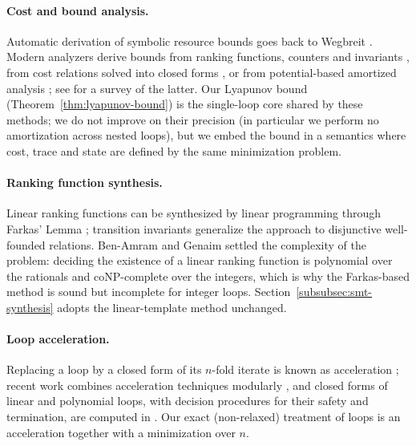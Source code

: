 \documentclass[oneside,english]{amsart}
\numberwithin{equation}{section}
\numberwithin{figure}{section}
\theoremstyle{plain}
\theoremstyle{definition}
\theoremstyle{plain}
\theoremstyle{remark}
\theoremstyle{plain}
\theoremstyle{definition}
\theoremstyle{plain}
\theoremstyle{remark}
\begin{document}
\paragraph{Cost and bound analysis.}
Automatic derivation of symbolic resource bounds goes back to Wegbreit \cite{wegbreit1975mechanical}.
Modern analyzers derive bounds from ranking functions, counters and invariants
\cite{gulwani2009speed,alias2010multi,sinn2014complexity,brockschmidt2016analyzing,lommen2022automatic}, from cost
relations solved into closed forms \cite{albert2011closed}, or from potential-based
amortized analysis \cite{hoffmann2012multivariate,carbonneaux2015compositional}; see \cite{hoffmann2022two} for a survey of
the latter. Our Lyapunov bound (Theorem~\ref{thm:lyapunov-bound})
is the single-loop core shared by these methods; we do not improve on their precision (in particular we perform no
amortization across nested loops), but we embed the bound in a semantics where cost, trace and state are
defined by the same minimization problem.

\paragraph{Ranking function synthesis.}
Linear ranking functions can be synthesized by linear programming through Farkas' Lemma
\cite{colon2001synthesis,podelski2004complete}; transition invariants \cite{podelski2004transition} generalize the
approach to disjunctive well-founded relations. Ben-Amram and Genaim \cite{benamram2014ranking} settled the complexity of
the problem: deciding the existence of a linear ranking function is polynomial over the rationals and coNP-complete over
the integers, which is why the Farkas-based method is sound but incomplete for integer loops.
Section~\ref{subsubsec:smt-synthesis} adopts the linear-template method unchanged.

\paragraph{Loop acceleration.}
Replacing a loop by a closed form of its $n$-fold iterate is known as acceleration \cite{bardin2008fast}; recent work
combines acceleration techniques modularly \cite{frohn2020calculus}, and closed forms of linear and polynomial loops, with decision procedures for their safety and termination, are computed in \cite{kincaid2019closed}. Our exact
(non-relaxed) treatment of loops is an acceleration together with a minimization over $n$.
\end{document}
